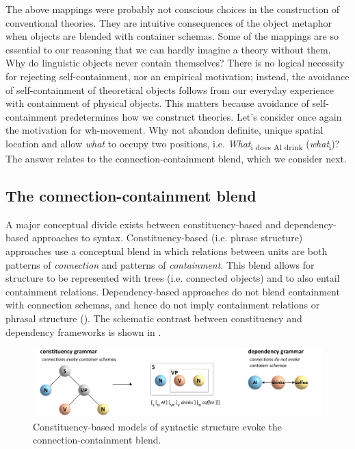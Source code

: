   The above mappings were probably not conscious choices in the construction of conventional theories. They are intuitive consequences of the object metaphor when objects are blended with container schemas. Some of the mappings are so essential to our reasoning that we can hardly imagine a theory without them. Why do linguistic objects never contain themselves? There is no logical necessity for rejecting self-containment, nor an empirical motivation; instead, the avoidance of self-containment of theoretical objects follows from our everyday experience with containment of physical objects. This matters because avoidance of self-containment predetermines how we construct theories. Let's consider once again the motivation for wh-movement. Why not abandon definite, unique spatial location and allow \textit{what} to occupy two positions, i.e. \textit{What}\textsubscript{i does Al drink} (\textit{what}\textsubscript{i})? The answer relates to the connection-containment blend, which we consider next.

\subsection{The connection-containment blend}

A major conceptual divide exists between constituency-based and dependency-based approaches to syntax. Constituency-based (i.e. phrase structure) approaches use a conceptual blend in which relations between units are both patterns of \textit{connection} and patterns of \textit{containment}. This blend allows for structure to be represented with trees (i.e. connected objects) and to also entail containment relations. Dependency-based approaches do not blend containment with connection schemas, and hence do not imply containment relations or phrasal structure (\citealt{Hays1964,Melʹčuk1988,Osborne2006,OsborneEtAl2011,Percival1990,Tesnière2018}). The schematic contrast between constituency and dependency frameworks is shown in {}. 

  
\begin{figure}
\includegraphics[width=\textwidth]{figures/Tilsen-img34.png}
\caption{Constituency-based models of syntactic structure evoke the connection-containment blend.}
\label{fig:3:6}
\end{figure}
 


